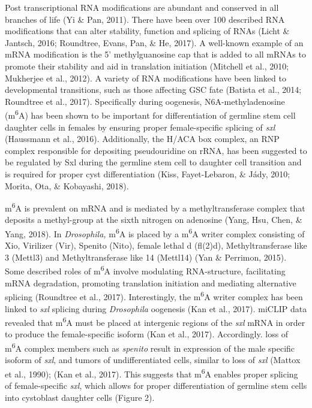 \documentclass[12pt,oneside]{reedthesis}
\begin{document}
Post transcriptional RNA modifications are abundant and conserved in all
branches of life (Yi \& Pan, 2011). There have been over 100 described RNA
modifications that can alter stability, function and splicing of RNAs
(Licht \& Jantsch, 2016; Roundtree, Evans, Pan, \& He, 2017). A well-known example of an mRNA
modification is the 5' methylguanosine cap that is added to all mRNAs to
promote their stability and aid in translation initiation
(Mitchell et al., 2010; Mukherjee et al., 2012). A variety of RNA modifications have
been linked to developmental transitions, such as those affecting GSC
fate (Batista et al., 2014; Roundtree et al., 2017). Specifically during oogenesis,
N6A-methyladenosine (m\textsuperscript{6}A) has been shown to be important for
differentiation of germline stem cell daughter cells in females by
ensuring proper female-specific splicing of \emph{sxl} (Haussmann et al., 2016).
Additionally, the H/ACA box complex, an RNP complex responsible for
depositing pseudouridine on rRNA, has been suggested to be regulated by
Sxl during the germline stem cell to daughter cell transition and is
required for proper cyst differentiation (Kiss, Fayet-Lebaron, \& Jády, 2010; Morita, Ota, \& Kobayashi, 2018).

m\textsuperscript{6}A is prevalent on mRNA and is mediated by a methyltransferase
complex that deposits a methyl-group at the sixth nitrogen on adenosine
(Yang, Hsu, Chen, \& Yang, 2018). In \emph{Drosophila,} m\textsuperscript{6}A is placed by a m\textsuperscript{6}A writer
complex consisting of Xio, Virilizer (Vir), Spenito (Nito), female
lethal d (fl(2)d), Methyltransferase like 3 (Mettl3) and
Methyltransferase like 14 (Mettl14) (Yan \& Perrimon, 2015). Some described roles
of m\textsuperscript{6}A involve modulating RNA-structure, facilitating mRNA
degradation, promoting translation initiation and mediating alternative
splicing (Roundtree et al., 2017). Interestingly, the m\textsuperscript{6}A writer complex
has been linked to \emph{sxl} splicing during \emph{Drosophila} oogenesis
(Kan et al., 2017). miCLIP data revealed that m\textsuperscript{6}A must be placed at
intergenic regions of the \emph{sxl} mRNA in order to produce the
female-specific isoform (Kan et al., 2017). Accordingly. loss of m\textsuperscript{6}A
complex members such as \emph{spenito} result in expression of the male
specific isoform of \emph{sxl}, and tumors of undifferentiated cells, similar
to loss of \emph{sxl} (Mattox et al., 1990); (Kan et al., 2017). This suggests that
m\textsuperscript{6}A enables proper splicing of female-specific \emph{sxl}, which allows for
proper differentiation of germline stem cells into cystoblast daughter
cells (Figure 2).
\end{document}
